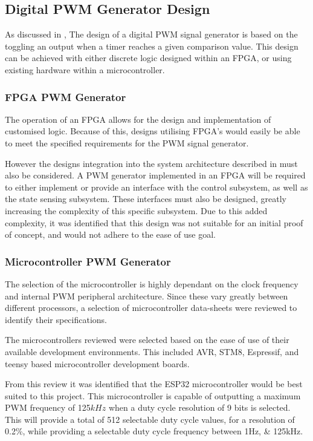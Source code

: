 \subsection{Digital PWM Generator Design}\label{S:PWM_digital_design}

As discussed in , The design of a digital PWM signal generator is based on the toggling an output when a timer reaches a given comparison value. This design can be achieved with either discrete logic designed within an FPGA, or using existing hardware within a microcontroller. 

\subsubsection*{FPGA PWM Generator}

The operation of an FPGA allows for the design and implementation of customised logic. Because of this, designs utilising FPGA's would easily be able to meet the specified requirements for the PWM signal generator.

However the designs integration into the system architecture described in  must also be considered. A PWM generator implemented in an FPGA will be required to either implement or provide an interface with the control subsystem, as well as the state sensing subsystem. These interfaces must also be designed, greatly increasing the complexity of this specific subsystem. Due to this added complexity, it was identified that this design was not suitable for an initial proof of concept, and would not adhere to the ease of use goal. 

\subsubsection*{Microcontroller PWM Generator}

The selection of the microcontroller is highly dependant on the clock frequency and internal PWM peripheral architecture. Since these vary greatly between different processors, a selection of microcontroller data-sheets were reviewed to identify their specifications. 

The microcontrollers reviewed were selected based on the ease of use of their available development environments. This included AVR, STM8, Espressif, and teensy based microcontroller development boards. 

From this review it was identified that the ESP32 microcontroller \cite{ESP32Manual} would be best suited to this project. This microcontroller is capable of outputting a maximum PWM frequency of 125$kHz$ when a duty cycle resolution of 9 bits is selected. This will provide a total of 512 selectable duty cycle values, for a resolution of 0.2\%, while providing a selectable duty cycle frequency between 1Hz, \& 125kHz. 

